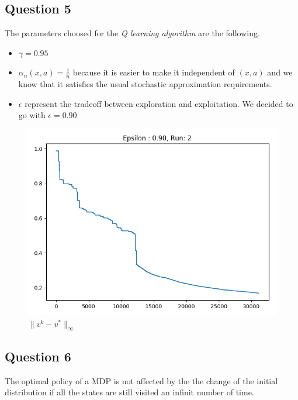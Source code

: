 \documentclass[10pt,a4paper]{article}
\begin{document}
\subsection{Question 5}
The parameters choosed for the \textit{Q learning algorithm} are the following.
\begin{itemize}
\item $\gamma = 0.95$
\item $\alpha_n(x,a) = \frac{1}{n}$ because it is easier to make it independent of $(x,a)$ and we know that it satisfies the usual stochastic approximation
requirements.
\item $\epsilon$ represent the tradeoff between exploration and exploitation. We decided to go with $\epsilon = 0.90$
\end{itemize}
\begin{figure}[h]
\centering
\caption{$\parallel v^k - v^* \parallel_{\infty}$}
\includegraphics[scale=.35]{q5.png}
\end{figure}
\subsection{Question 6}
The optimal policy of a MDP is not affected by the the change of the initial distribution if all the states are still visited an infinit number of time.
\end{document}
